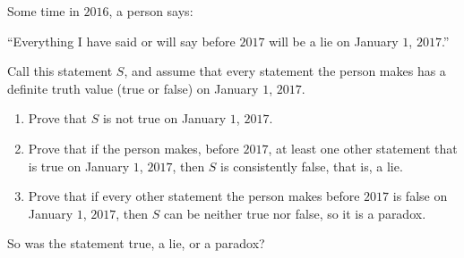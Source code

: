 Some time in $2016$, a person says:

``Everything I have said or will say before $2017$ will be a lie on January $1$, $2017$.''

Call this statement $S$, and assume that every statement the person makes has a definite truth value (true or false) on January $1$, $2017$.
\begin{enumerate}
\item[(a)] Prove that $S$ is not true on January $1$, $2017$.
\item[(b)] Prove that if the person makes, before $2017$, at least one other statement that is true on January $1$, $2017$, then $S$ is consistently false, that is, a lie.
\item[(c)] Prove that if every other statement the person makes before $2017$ is false on January $1$, $2017$, then $S$ can be neither true nor false, so it is a paradox.
\end{enumerate}
So was the statement true, a lie, or a paradox?
